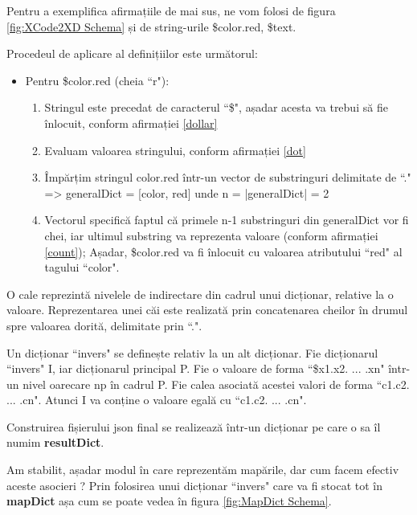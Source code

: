 Pentru a exemplifica afirmațiile de mai sus, ne vom folosi de figura \ref{fig:XCode2XD Schema} și de string-urile \$color.red, \$text. 

Procedeul de aplicare al definițiilor este următorul:

\begin{itemize} \label{modalitate}
\item Pentru \$color.red (cheia ``r"): 
\begin{enumerate}
\item Stringul este precedat de caracterul ``\$", așadar acesta va trebui să fie înlocuit, conform afirmației \ref{dollar}
\item Evaluam valoarea stringului, conform afirmației \ref{dot}
\item Împărțim stringul color.red într-un vector de substringuri delimitate de ``." => generalDict = [color, red] unde n = |generalDict| = 2
\item Vectorul specifică faptul că primele n-1 substringuri din generalDict vor fi chei, iar ultimul substring va reprezenta valoare (conform afirmației \ref{count}); Așadar, \$color.red va fi înlocuit cu valoarea atributului ``red" al tagului ``color".
\end{enumerate}
\end{itemize}


\begin{mydef}\label{cale}
O cale reprezintă nivelele de indirectare din cadrul unui dicționar, relative la o valoare.
Reprezentarea unei căi este realizată prin concatenarea cheilor în drumul spre valoarea dorită, delimitate prin ``.".
\end{mydef}


\begin{mydef}

Un dicționar ``invers" se definește relativ la un alt dicționar. 
Fie dicționarul ``invers" I, iar dicționarul principal P. 
Fie o valoare de forma ``\$x1.x2. ... .xn" într-un nivel oarecare np în cadrul P. 
Fie calea asociată acestei valori de forma ``c1.c2. ... .cn".
Atunci I va conține o valoare egală cu ``c1.c2. ... .cn".
\end{mydef}

\begin{myNote}
Construirea fișierului json final se realizează într-un dicționar pe care o sa îl numim \textbf{resultDict}.
\end{myNote}

Am stabilit, așadar modul în care reprezentăm mapările, dar cum facem efectiv aceste asocieri ? Prin folosirea unui dicționar ``invers" care va fi stocat tot în \textbf{mapDict} așa cum se poate vedea în figura \ref{fig:MapDict Schema}.

